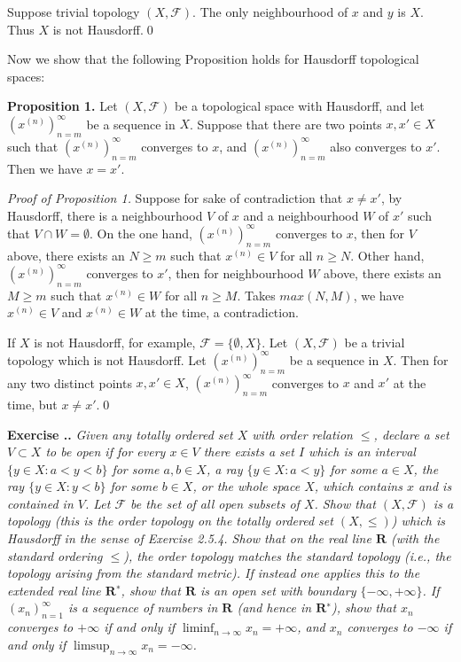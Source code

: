 \documentclass{book}
\newcommand{\titl}[1]{\noindent\textbf{#1}}
\newcounter{Exercise}[section]
\renewcommand{\theExercise}{\thesection.\arabic{Exercise}.}
\newcommand{\new}{\vspace{1.5em}\noindent\textbf{Exercise \stepcounter{Exercise}\textbf{\theExercise}} }
\begin{document}
Suppose trivial topology $(X,\mathcal{F})$. The only neighbourhood of $x$ and $y$ is $X$. Thus $X$ is not Hausdorff.\qed

Now we show that the following Proposition holds for Hausdorff topological spaces:
\begin{framed}
\titl{Proposition 1.} Let $(X,\mathcal{F})$ be a topological space with Hausdorff, and let $(x^{(n)})_{n=m}^{\infty}$ be a sequence in $X$. Suppose that there are two points $x,x'\in X$ such that $(x^{(n)})_{n=m}^{\infty}$ converges to $x$, and $(x^{(n)})_{n=m}^{\infty}$ also converges to $x'$. Then we have $x=x'$.
\end{framed}

\noindent\emph{Proof of Proposition 1.} Suppose for sake of contradiction that $x\neq x'$, by Hausdorff, there is a neighbourhood $V$ of $x$ and a neighbourhood $W$ of $x'$ such that $V\cap W=\emptyset$. On the one hand, $(x^{(n)})_{n=m}^{\infty}$ converges to $x$, then for $V$ above, there exists an $N\geq m$ such that $x^{(n)}\in V$ for all $n\geq N$. Other hand, $(x^{(n)})_{n=m}^{\infty}$ converges to $x'$, then for neighbourhood $W$ above, there exists an $M\geq m$ such that $x^{(n)}\in W$ for all $n\geq M$. Takes $max(N,M)$, we have $x^{(n)}\in V$ and $x^{(n)}\in W$ at the time, a contradiction.

If $X$ is not Hausdorff, for example, $\mathcal{F}=\{\emptyset,X\}$. Let $(X,\mathcal{F})$ be a trivial topology which is not Hausdorff. Let $(x^{(n)})_{n=m}^{\infty}$ be a sequence in $X$. Then for any two distinct points $x,x'\in X$, $(x^{(n)})_{n=m}^{\infty}$ converges to $x$ and $x'$ at the time, but $x\neq x'$.\qed

\new\emph{Given any totally ordered set $X$ with order relation $\leq$, declare a set $V\subset X$ to be \textnormal{open} if for every $x\in V$ there exists a set $I$ which is an interval $\{y\in X:a<y<b\}$ for some $a,b\in X$, a ray $\{y\in X:a<y\}$ for some $a\in X$, the ray $\{y\in X:y<b\}$ for some $b\in X$, or the whole space $X$, which contains $x$ and is contained in $V$. Let $\mathcal{F}$ be the set of all open subsets of $X$. Show that $(X,\mathcal{F})$ is a topology (this is the \textnormal{order topology} on the totally ordered set $(X,\leq)$) which is Hausdorff in the sense of Exercise 2.5.4. Show that on the real line $\mathbf{R}$ (with the standard ordering $\leq$), the order topology matches the standard topology (i.e., the topology arising from the standard metric). If instead one applies this to the extended real line $\mathbf{R}^∗$, show that $\mathbf{R}$ is an open set with boundary $\{-\infty,+\infty\}$. If $(x_n)_{n=1}^{\infty}$ is a sequence of numbers in $\mathbf{R}$ (and hence in $\mathbf{R}^∗$), show that $x_n$ converges to $+\infty$ if and only if $\liminf_{n\to\infty}x_n=+\infty$, and $x_n$ converges to $-\infty$ if and only if $\limsup_{n\to\infty}x_n=-\infty$.}
\end{document}
